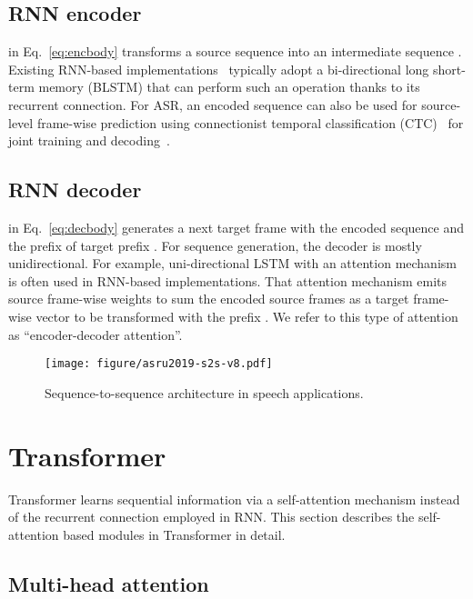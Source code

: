 \subsection{RNN encoder}
\label{sec:rnn_enc}
 in Eq.~\eqref{eq:encbody} transforms a source sequence  into an intermediate sequence . Existing RNN-based  implementations~\cite{Bahdanau15,Chan2016,DBLP:conf/icassp/ShenPWSJYCZWRSA18} typically adopt a bi-directional long short-term memory (BLSTM) that can perform such an operation thanks to its recurrent connection. For ASR, an encoded sequence  can also be used for source-level frame-wise prediction using connectionist temporal classification (CTC)~\cite{ctc-DBLP:conf/icml/GravesFGS06} for joint training and decoding~\cite{hori2018end}.

\subsection{RNN decoder}
\label{sec:rnn_dec}
 in Eq.~\eqref{eq:decbody} generates a next target frame with the encoded sequence  and the prefix of target prefix .
For sequence generation, the decoder is mostly unidirectional. For example, uni-directional LSTM with an attention mechanism~\cite{Bahdanau15} is often used in RNN-based  implementations. That attention mechanism emits source frame-wise weights to sum the encoded source frames  as a target frame-wise vector to be transformed with the prefix . We refer to this type of attention as ``encoder-decoder attention''.

\begin{figure}
    \centering
    \vspace{-2mm}
    \texttt{[image: figure/asru2019-s2s-v8.pdf]}
    \vspace{-2mm}
    \caption{Sequence-to-sequence architecture in speech applications.}
    \vspace{-4mm}
    \label{fig:s2s}
\end{figure}


\section{Transformer}
\label{sec:transformer}

Transformer learns sequential information via a self-attention mechanism instead of the recurrent connection employed in RNN.
This section describes the self-attention based modules in Transformer in detail.

\subsection{Multi-head attention}

